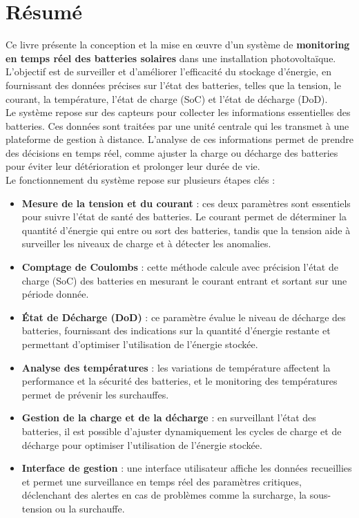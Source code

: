 \chapter*{Résumé}
{}


Ce livre présente la conception et la mise en œuvre d'un système de \textbf{monitoring en temps réel des batteries solaires} dans une installation photovoltaïque. L'objectif est de surveiller et d'améliorer l'efficacité du stockage d'énergie, en fournissant des données précises sur l'état des batteries, telles que la tension, le courant, la température, l'état de charge (SoC) et l'état de décharge (DoD).\\

Le système repose sur des capteurs pour collecter les informations essentielles des batteries. Ces données sont traitées par une unité centrale qui les transmet à une plateforme de gestion à distance. L'analyse de ces informations permet de prendre des décisions en temps réel, comme ajuster la charge ou décharge des batteries pour éviter leur détérioration et prolonger leur durée de vie.\\

Le fonctionnement du système repose sur plusieurs étapes clés :
\begin{itemize}
	\item \textbf{Mesure de la tension et du courant} : ces deux paramètres sont essentiels pour suivre l'état de santé des batteries. Le courant permet de déterminer la quantité d'énergie qui entre ou sort des batteries, tandis que la tension aide à surveiller les niveaux de charge et à détecter les anomalies.
	\item \textbf{Comptage de Coulombs} : cette méthode calcule avec précision l'état de charge (SoC) des batteries en mesurant le courant entrant et sortant sur une période donnée.
	\item \textbf{État de Décharge (DoD)} : ce paramètre évalue le niveau de décharge des batteries, fournissant des indications sur la quantité d'énergie restante et permettant d'optimiser l'utilisation de l'énergie stockée.
	\item \textbf{Analyse des températures} : les variations de température affectent la performance et la sécurité des batteries, et le monitoring des températures permet de prévenir les surchauffes.
	\item \textbf{Gestion de la charge et de la décharge} : en surveillant l'état des batteries, il est possible d'ajuster dynamiquement les cycles de charge et de décharge pour optimiser l'utilisation de l'énergie stockée.
	\item \textbf{Interface de gestion} : une interface utilisateur affiche les données recueillies et permet une surveillance en temps réel des paramètres critiques, déclenchant des alertes en cas de problèmes comme la surcharge, la sous-tension ou la surchauffe.
\end{itemize}

